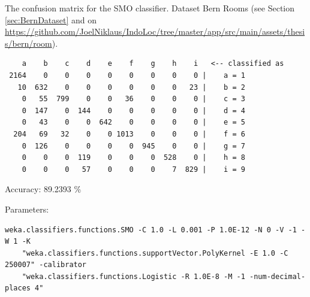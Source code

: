 \begin{table}[H]
\caption{The confusion matrix for the SMO classifier. Dataset Bern Rooms (see Section \ref{sec:BernDataset} and on \url{https://github.com/JoelNiklaus/IndoLoc/tree/master/app/src/main/assets/thesis/bern/room}).}
\label{ver:ConfusionMatrixSMO}
\begin{threeparttable}
\begin{verbatim}
    a    b    c    d    e    f    g    h    i   <-- classified as
 2164    0    0    0    0    0    0    0    0 |    a = 1
   10  632    0    0    0    0    0    0   23 |    b = 2
    0   55  799    0    0   36    0    0    0 |    c = 3
    0  147    0  144    0    0    0    0    0 |    d = 4
    0   43    0    0  642    0    0    0    0 |    e = 5
  204   69   32    0    0 1013    0    0    0 |    f = 6
    0  126    0    0    0    0  945    0    0 |    g = 7
    0    0    0  119    0    0    0  528    0 |    h = 8
    0    0    0   57    0    0    0    7  829 |    i = 9
\end{verbatim}
\begin{tablenotes}
\item Accuracy: 89.2393 \%
\item Parameters:
\tiny{
\begin{verbatim}
weka.classifiers.functions.SMO -C 1.0 -L 0.001 -P 1.0E-12 -N 0 -V -1 -W 1 -K
    "weka.classifiers.functions.supportVector.PolyKernel -E 1.0 -C 250007" -calibrator
    "weka.classifiers.functions.Logistic -R 1.0E-8 -M -1 -num-decimal-places 4"
\end{verbatim}
}
\end{tablenotes}
\end{threeparttable}
\end{table}


